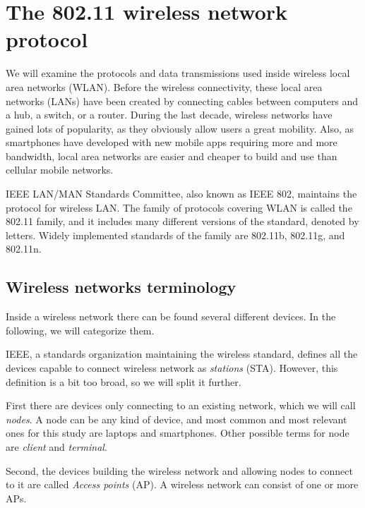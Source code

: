 \documentclass[12pt,a4paper,oneside,pdftex]{report}
\begin{document}


\chapter{The 802.11 wireless network protocol}
\label{chapter:protocol}

We will examine the protocols and data transmissions used inside wireless local area networks (WLAN). Before the wireless connectivity, these local area networks (LANs) have been created by connecting cables between computers and a hub, a switch, or a router. During the last decade, wireless networks have gained lots of popularity, as they obviously allow users a great mobility. Also, as smartphones have developed with new mobile apps requiring more and more bandwidth, local area networks are easier and cheaper to build and use than cellular mobile networks.

IEEE LAN/MAN Standards Committee, also known as IEEE 802, maintains the protocol for wireless LAN. The family of protocols covering WLAN is called the 802.11 family, and it includes many different versions of the standard, denoted by letters. Widely implemented standards of the family are 802.11b, 802.11g, and 802.11n.~\cite{IEEE802.11}


\section{Wireless networks terminology}
\label{sec:terminology}

Inside a wireless network there can be found several different devices. In the following, we will categorize them.

IEEE, a standards organization maintaining the wireless standard, defines all the devices capable to connect wireless network as \emph{stations} (STA). However, this definition is a bit too broad, so we will split it further.

First there are devices only connecting to an existing network, which we will call \emph{nodes}. A node can be any kind of device, and most common and most relevant ones for this study are laptops and smartphones. Other possible terms for node are \emph{client} and \emph{terminal}.

Second, the devices building the wireless network and allowing nodes to connect to it are called \emph{Access points} (AP). A wireless network can consist of one or more APs.
\end{document}
